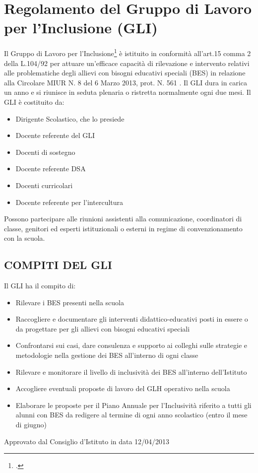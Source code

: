 \section*{Regolamento del  Gruppo di Lavoro per l'Inclusione (GLI)}
Il Gruppo di Lavoro per l'Inclusione\footcite{ISISLinoZanussiPordenone2013} è istituito in conformità all'art.15 comma 2 della
L.104/92 per attuare un'efficace capacità di rilevazione e intervento relativi alle
problematiche degli allievi con bisogni educativi speciali (BES) in relazione alla Circolare
MIUR N. 8 del 6 Marzo 2013, prot. N. 561 .
Il GLI dura in carica un anno e si riunisce in seduta plenaria o ristretta normalmente ogni
due mesi.
Il GLI è costituito da:
\begin{itemize}
	\item Dirigente Scolastico, che lo presiede
	\item Docente referente del GLI
	\item  Docenti di sostegno
	\item Docente referente DSA
	\item  Docenti curricolari
	\item Docente referente per l'intercultura
\end{itemize}
Possono partecipare alle riunioni assistenti alla comunicazione, coordinatori di classe,
genitori ed esperti istituzionali o esterni in regime di convenzionamento con la scuola.
\subsection*{COMPITI DEL GLI}
Il GLI ha il compito di:
\begin{itemize}
	\item Rilevare i BES presenti nella scuola
	\item  Raccogliere e documentare gli interventi didattico-educativi posti in essere o da
	progettare per gli allievi con bisogni educativi speciali
	\item Confrontarsi sui casi, dare consulenza e supporto ai colleghi sulle strategie e
	metodologie nella gestione dei BES all'interno di ogni classe
	\item Rilevare e monitorare il livello di inclusività dei BES all'interno dell'Istituto
	\item Accogliere eventuali proposte di lavoro del GLH operativo nella scuola
	\item Elaborare le proposte per il Piano Annuale per l'Inclusività riferito a tutti gli alunni
	con BES da redigere al termine di ogni anno scolastico (entro il mese di giugno)
\end{itemize}
Approvato dal Consiglio d'Istituto in data 12/04/2013